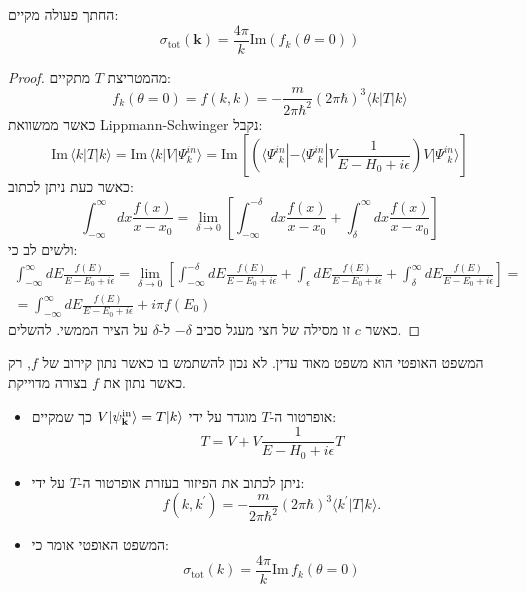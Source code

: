 \documentclass{tstextbook}
\begin{document}
\begin{proposition}
החתך פעולה מקיים:
$$\sigma_{\text{tot}}\left( \mathbf{k} \right)=\frac{4\pi}{k}\mathrm{Im}\left( f_{k}\left( \theta=0 \right) \right)$$

\end{proposition}
\begin{proof}
מהמטריצת \(T\) מתקיים:
$$f_{k}\left( \theta=0 \right)=f(k,k)=-\frac{m}{2\pi\hbar^{2}}\left( 2\pi\hbar \right)^{3}\langle k|T|k\rangle$$
כאשר ממשוואת Lippmann-Schwinger נקבל:
$$\mathrm{Im}\,\langle k|T|k\rangle=\mathrm{Im}\,\langle k|V|\Psi_{k}^{i n}\rangle=\mathrm{Im}\,\left[\left(\langle\Psi_{\,\,k}^{i n}|-\langle\Psi_{\,\,k}^{i n}|V\frac{1}{E-H_{0}+i\epsilon}\right)V|\Psi_{\,\,k}^{i n}\rangle\right]$$
כאשר כעת ניתן לכתוב:
$$\int_{-\infty}^{\infty}d x{\frac{f(x)}{x-x_{0}}}=\operatorname*{lim}_{\delta\to0}\left[\int_{-\infty}^{-\delta}d x{\frac{f(x)}{x-x_{0}}}+\int_{\delta}^{\infty}d x{\frac{f(x)}{x-x_{0}}}\right]$$
ולשים לב כי:
$$\begin{gather}\int_{-\infty}^{\infty}d E\frac{f(E)}{E-E_{0}+i\epsilon}=\lim_{\delta\to0}\left[\int_{-\infty}^{-\delta}\!d E\frac{f(E)}{E-E_{0}+i\epsilon}+\int_{\epsilon}\!d E\frac{f(E)}{E-E_{0}+i\epsilon}+\int_{\delta}^{\infty}\!d E\frac{f(E)}{E-E_{0}+i\epsilon}\right]=\\=\int_{-\infty}^{\infty}d E\frac{f(E)}{E-E_{0}+i\epsilon}+i\pi f(E_{0}) 
\end{gather}$$
כאשר \(c\) זו מסילה של חצי מעגל סביב \(-\delta\) ל-\(\delta\) על הציר הממשי. להשלים.

\end{proof}
\begin{remark}
המשפט האופטי הוא משפט מאוד עדין. לא נכון להשתמש בו כאשר נתון קירוב של \(f\), רק כאשר נתון את \(f\) בצורה מדוייקת.

\end{remark}
\begin{summary}
  \begin{itemize}
    \item אופרטור ה-\(T\) מוגדר על ידי \(V|\psi_{\bf k}^{\mathrm{in}}\rangle=T|k\rangle\) כך שמקיים:
$$T=V+V\frac{1}{E-H_{0}+i\epsilon}T$$
    \item ניתן לכתוב את הפיזור בעזרת אופרטור ה-\(T\) על ידי:
$$f(k,k^{\prime})=-\frac{m}{2\pi\hbar^{2}}(2\pi\hbar)^{3}\langle k^{\prime}|T|k\rangle.$$
    \item המשפט האופטי אומר כי:
$$\sigma_{\mathrm{tot}}(k)=\frac{4\pi}{k}\mathrm{Im}\,f_{k}(\theta=0)$$
  \end{itemize}
\end{summary}
\end{document}
